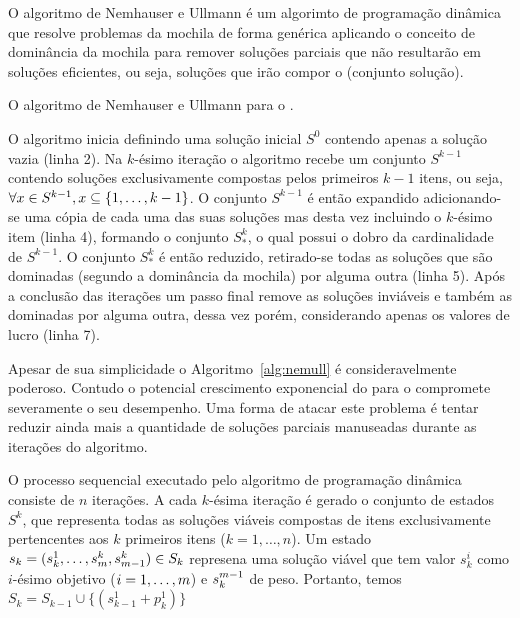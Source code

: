 

O algoritmo de Nemhauser e Ullmann é um algorimto de programação dinâmica
que resolve problemas da mochila de forma genérica aplicando o conceito de
dominância da mochila para remover soluções parciais que não resultarão em
soluções eficientes, ou seja, soluções que irão compor o \paretoset{} (conjunto solução).

\begin{algorithm}
  \caption{O algoritmo de Nemhauser e Ullmann para o \mokp.}
  \label{alg:nemull}
  
\end{algorithm}

O algoritmo inicia definindo uma solução inicial $S^0$ contendo apenas a solução
vazia (linha 2).
Na $k$-ésimo iteração o algoritmo recebe um conjunto $S^{k-1}$ contendo
soluções exclusivamente compostas pelos primeiros ${k-1}$ itens,
ou seja, $\forall x \in S^{k-1}, x \subseteq \{1, \ldots, k-1\}$.
O conjunto $S^{k-1}$ é então expandido adicionando-se uma cópia de cada uma
das suas soluções mas desta vez incluindo o $k$-ésimo item (linha 4),
formando o conjunto $S^k_*$, o qual possui o dobro da cardinalidade de $S^{k-1}$.
O conjunto $S^k_*$ é então reduzido, retirado-se todas as soluções que são dominadas
(segundo a dominância da mochila) por alguma outra (linha 5).
Após a conclusão das iterações um passo final remove as soluções inviáveis
e também as dominadas por alguma outra, dessa vez porém, considerando apenas os
valores de lucro (linha 7).

Apesar de sua simplicidade o Algoritmo~\ref{alg:nemull} é consideravelmente poderoso.
Contudo o potencial crescimento exponencial do \paretoset{} para o \mokp
compromete severamente o seu desempenho.
Uma forma de atacar este problema é tentar reduzir ainda mais a quantidade de
soluções parciais manuseadas durante as iterações do algoritmo.



O processo sequencial executado pelo algoritmo de programação dinâmica
consiste de $n$ iterações.
A cada $k$-ésima iteração é gerado o conjunto de estados $S^k$,
que representa todas as soluções viáveis compostas de itens exclusivamente
pertencentes aos $k$ primeiros itens ($k = 1, \ldots, n$).
Um estado $s_k = (s_k^1, \ldots, s_m^k, s_{m-1}^k) \in S_k$ represena uma solução
viável que tem valor $s^i_k$ como $i$-ésimo objetivo ($i = 1, \ldots, m$)
e $s^{m-1}_k$ de peso.
Portanto, temos $S_k = S_{k-1} \cup \{(s^1_{k-1}+p^1_k)\}$

